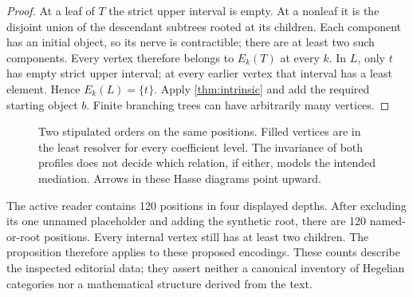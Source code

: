 \begin{proof}
At a leaf of $T$ the strict upper interval is empty. At a nonleaf it is
the disjoint union of the descendant subtrees rooted at its children.
Each component has an initial object, so its nerve is contractible;
there are at least two such components. Every vertex therefore belongs
to $E_k(T)$ at every $k$. In $L$, only $t$ has empty strict upper
interval; at every earlier vertex that interval has a least element.
Hence $E_k(L)=\{t\}$. Apply \cref{thm:intrinsic} and add the required
starting object $b$. Finite branching trees can have arbitrarily many
vertices.
\end{proof}

\begin{figure}[htbp]
\centering
{}
\caption{Two stipulated orders on the same positions. Filled vertices
are in the least resolver for every coefficient level. The invariance
of both profiles does not decide which relation, if either, models
the intended mediation. Arrows in these Hasse diagrams point upward.}
\label{fig:treechain}
\end{figure}

The active reader contains 120 positions in four displayed depths.
After excluding its one unnamed placeholder and adding the synthetic
root, there are 120 named-or-root positions. Every internal vertex
still has at least two children. The proposition therefore applies
to these proposed encodings. These counts describe the inspected
editorial data; they assert neither a canonical inventory of Hegelian
categories nor a mathematical structure derived from the text.

